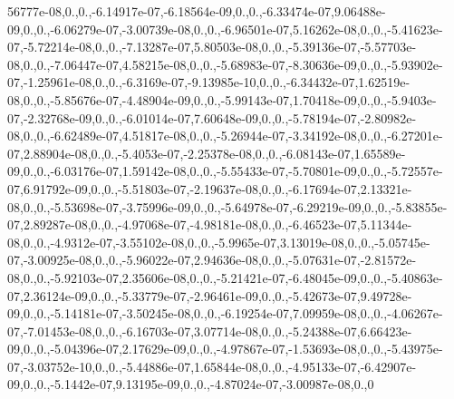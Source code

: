 {\-56777e-\/08,0.,0.,-\/6.\-14917e-\/07,-\/6.\-18564e-\/09,0.,0.,-\/6.\-33474e-\/07,9.\-06488e-\/09,0.,0.,-\/6.\-06279e-\/07,-\/3.\-00739e-\/08,0.,0.,-\/6.\-96501e-\/07,5.\-16262e-\/08,0.,0.,-\/5.\-41623e-\/07,-\/5.\-72214e-\/08,0.,0.,-\/7.\-13287e-\/07,5.\-80503e-\/08,0.,0.,-\/5.\-39136e-\/07,-\/5.\-57703e-\/08,0.,0.,-\/7.\-06447e-\/07,4.\-58215e-\/08,0.,0.,-\/5.\-68983e-\/07,-\/8.\-30636e-\/09,0.,0.,-\/5.\-93902e-\/07,-\/1.\-25961e-\/08,0.,0.,-\/6.\-3169e-\/07,-\/9.\-13985e-\/10,0.,0.,-\/6.\-34432e-\/07,1.\-62519e-\/08,0.,0.,-\/5.\-85676e-\/07,-\/4.\-48904e-\/09,0.,0.,-\/5.\-99143e-\/07,1.\-70418e-\/09,0.,0.,-\/5.\-9403e-\/07,-\/2.\-32768e-\/09,0.,0.,-\/6.\-01014e-\/07,7.\-60648e-\/09,0.,0.,-\/5.\-78194e-\/07,-\/2.\-80982e-\/08,0.,0.,-\/6.\-62489e-\/07,4.\-51817e-\/08,0.,0.,-\/5.\-26944e-\/07,-\/3.\-34192e-\/08,0.,0.,-\/6.\-27201e-\/07,2.\-88904e-\/08,0.,0.,-\/5.\-4053e-\/07,-\/2.\-25378e-\/08,0.,0.,-\/6.\-08143e-\/07,1.\-65589e-\/09,0.,0.,-\/6.\-03176e-\/07,1.\-59142e-\/08,0.,0.,-\/5.\-55433e-\/07,-\/5.\-70801e-\/09,0.,0.,-\/5.\-72557e-\/07,6.\-91792e-\/09,0.,0.,-\/5.\-51803e-\/07,-\/2.\-19637e-\/08,0.,0.,-\/6.\-17694e-\/07,2.\-13321e-\/08,0.,0.,-\/5.\-53698e-\/07,-\/3.\-75996e-\/09,0.,0.,-\/5.\-64978e-\/07,-\/6.\-29219e-\/09,0.,0.,-\/5.\-83855e-\/07,2.\-89287e-\/08,0.,0.,-\/4.\-97068e-\/07,-\/4.\-98181e-\/08,0.,0.,-\/6.\-46523e-\/07,5.\-11344e-\/08,0.,0.,-\/4.\-9312e-\/07,-\/3.\-55102e-\/08,0.,0.,-\/5.\-9965e-\/07,3.\-13019e-\/08,0.,0.,-\/5.\-05745e-\/07,-\/3.\-00925e-\/08,0.,0.,-\/5.\-96022e-\/07,2.\-94636e-\/08,0.,0.,-\/5.\-07631e-\/07,-\/2.\-81572e-\/08,0.,0.,-\/5.\-92103e-\/07,2.\-35606e-\/08,0.,0.,-\/5.\-21421e-\/07,-\/6.\-48045e-\/09,0.,0.,-\/5.\-40863e-\/07,2.\-36124e-\/09,0.,0.,-\/5.\-33779e-\/07,-\/2.\-96461e-\/09,0.,0.,-\/5.\-42673e-\/07,9.\-49728e-\/09,0.,0.,-\/5.\-14181e-\/07,-\/3.\-50245e-\/08,0.,0.,-\/6.\-19254e-\/07,7.\-09959e-\/08,0.,0.,-\/4.\-06267e-\/07,-\/7.\-01453e-\/08,0.,0.,-\/6.\-16703e-\/07,3.\-07714e-\/08,0.,0.,-\/5.\-24388e-\/07,6.\-66423e-\/09,0.,0.,-\/5.\-04396e-\/07,2.\-17629e-\/09,0.,0.,-\/4.\-97867e-\/07,-\/1.\-53693e-\/08,0.,0.,-\/5.\-43975e-\/07,-\/3.\-03752e-\/10,0.,0.,-\/5.\-44886e-\/07,1.\-65844e-\/08,0.,0.,-\/4.\-95133e-\/07,-\/6.\-42907e-\/09,0.,0.,-\/5.\-1442e-\/07,9.\-13195e-\/09,0.,0.,-\/4.\-87024e-\/07,-\/3.\-00987e-\/08,0.,0}
